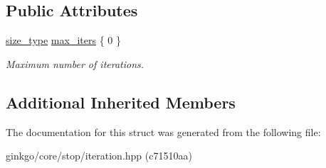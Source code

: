 \subsection*{Public Attributes}
\begin{DoxyCompactItemize}
\item 
\mbox{\label{structgko_1_1stop_1_1Iteration_1_1parameters__type_a7daf7ecb5cf107b9e7444b0898f691c4}} 
\hyperlink{namespacegko_a6e5c95df0ae4e47aab2f604a22d98ee7}{size\+\_\+type} \hyperlink{structgko_1_1stop_1_1Iteration_1_1parameters__type_a7daf7ecb5cf107b9e7444b0898f691c4}{max\+\_\+iters} \{ 0 \}
\begin{DoxyCompactList}\small\item\em Maximum number of iterations. \end{DoxyCompactList}\end{DoxyCompactItemize}
\subsection*{Additional Inherited Members}


The documentation for this struct was generated from the following file\+:\begin{DoxyCompactItemize}
\item 
ginkgo/core/stop/iteration.\+hpp (c71510aa)\end{DoxyCompactItemize}
